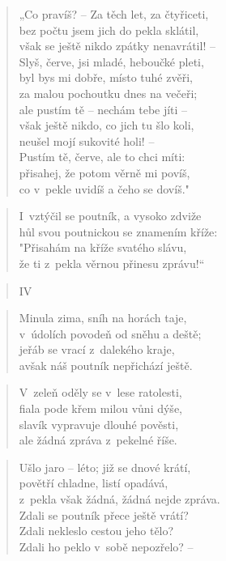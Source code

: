 \begin{verse}
„Co pravíš? -- Za těch let, za čtyřiceti, \\
bez počtu jsem jich do pekla sklátil, \\
však se ještě nikdo zpátky nenavrátil! -- \\
Slyš, červe, jsi mladé, heboučké pleti, \\
byl bys mi dobře, místo tuhé zvěři, \\
za malou pochoutku dnes na večeři; \\
ale pustím tě -- nechám tebe jíti -- \\
však ještě nikdo, co jich tu šlo koli, \\
neušel mojí sukovité holi! -- \\
Pustím tě, červe, ale to chci míti: \\
přisahej, že potom věrně mi povíš, \\
co v~pekle uvidíš a čeho se dovíš."
\end{verse}

\begin{verse}
I~vztýčil se poutník, a vysoko zdviže \\
hůl svou poutnickou se znamením kříže: \\
"Přisahám na kříže svatého slávu, \\
že ti z~pekla věrnou přinesu zprávu!“
\end{verse}

\begin{verse}
IV
\end{verse}

\begin{verse}
Minula zima, sníh na horách taje, \\
v~údolích povodeň od sněhu a deště; \\
jeřáb se vrací z~dalekého kraje, \\
avšak náš poutník nepřichází ještě.
\end{verse}

\begin{verse}
V~zeleň oděly se v~lese ratolesti, \\
fiala pode křem milou vůni dýše, \\
slavík vypravuje dlouhé pověsti, \\
ale žádná zpráva z~pekelné říše.
\end{verse}

\begin{verse}
Ušlo jaro -- léto; již se dnové krátí, \\
povětří chladne, listí opadává, \\
z~pekla však žádná, žádná nejde zpráva. \\
Zdali se poutník přece ještě vrátí? \\
Zdali nekleslo cestou jeho tělo? \\
Zdali ho peklo v~sobě nepozřelo? --
\end{verse}

